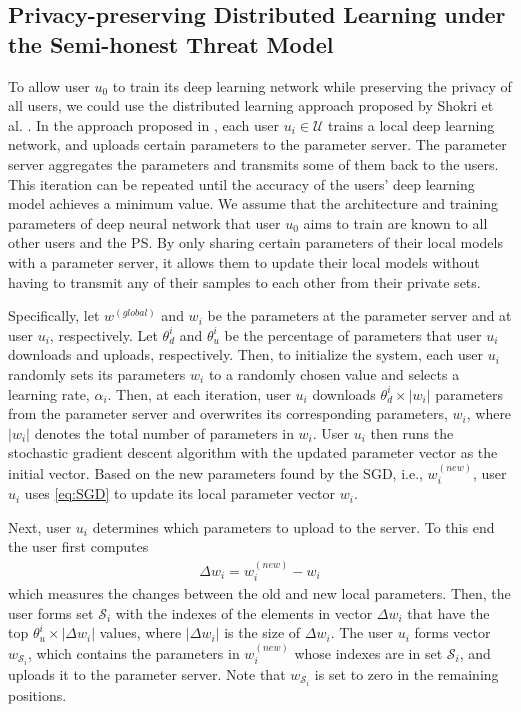 \documentclass[letterpaper]{article}
\begin{document}
\begin{flushleft}
{%
\subsection{Privacy-preserving Distributed Learning under the Semi-honest Threat Model}
To allow user $u_0$ to train its deep learning network while preserving the privacy of all users, we could use the distributed
learning approach proposed by Shokri et al. \cite{shokri2015privacy}. 
In the approach proposed in \cite{shokri2015privacy}, each user $u_i\in\mathcal{U}$ trains a local deep learning
network, and uploads certain parameters to the parameter server. The parameter server aggregates the parameters and transmits some of
them back to the users. This iteration can be repeated until the accuracy of the users' deep learning model achieves a minimum value. 
We assume that the architecture and training parameters of  deep neural network that user $u_0$ aims to
train are known  to all other users and the PS.
By only sharing certain parameters of their local models
with a parameter server, it allows them to update their local models without having to transmit any of their samples to each other
from their private sets. 

Specifically, let  $w^{(global)}$ and $w_i$ be the parameters at the parameter server and at user $u_i$, respectively. Let 
$\theta_d^{i}$ and $\theta_u^{i}$ be the percentage of parameters that user $u_i$ downloads and uploads, respectively. Then, 
to initialize the system,  each user $u_i$ randomly sets its parameters $w_i$ to a randomly chosen value and selects a learning rate,
$\alpha_i$. Then, at each iteration,  user $u_i$  downloads $\theta_d^{i} \times |w_i|$ parameters from the parameter server and
overwrites its corresponding parameters, $w_i$, where $|w_i|$ denotes the total number of parameters in $w_i$. User $u_i$ then runs the
stochastic gradient descent algorithm 
with the updated parameter vector as the initial vector. 
Based on the new parameters found by the SGD, i.e., $w_i^{(new)}$, user $u_i$ uses \eqref{eq:SGD} to update its local parameter vector $w_i$. 

Next, user $u_i$ determines which parameters to upload to the server. 
To this end the user first computes 
\begin{align}\label{eq:deltaParam}
\Delta w_i =  w_i^{(new)} -  w_i
\end{align}
which measures the changes between the old and new
local parameters. Then, the user forms set $\mathcal{S}_i$ with the indexes of the elements in vector $\Delta w_i$ that have the top 
$\theta_u^{i} \times |\Delta w_i|$ values, where $|\Delta w_i|$ is the size of $\Delta w_i$. 
The user $u_i$ forms vector $w_{\mathcal{S}_i}$, which contains the parameters in $w_i^{(new)}$ whose indexes are in
set $\mathcal{S}_i$, and uploads it to the parameter server. Note that $w_{\mathcal{S}_i}$  is set to zero in the remaining
positions. 

}
\end{flushleft}
\end{document}
